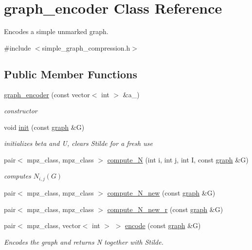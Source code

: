 \hypertarget{classgraph__encoder}{}\section{graph\+\_\+encoder Class Reference}
\label{classgraph__encoder}


Encodes a simple unmarked graph.  




{\ttfamily \#include $<$simple\+\_\+graph\+\_\+compression.\+h$>$}

\subsection*{Public Member Functions}
\begin{DoxyCompactItemize}
\item 
\hyperlink{classgraph__encoder_a571aefbf0b6ad203346fc4e0ef1a33dc}{graph\+\_\+encoder} (const vector$<$ int $>$ \&a\+\_\+)
\begin{DoxyCompactList}\small\item\em constructor \end{DoxyCompactList}\item 
void \hyperlink{classgraph__encoder_a6cfb6fca4bc50d4e5d267060a91f43c3}{init} (const \hyperlink{classgraph}{graph} \&G)
\begin{DoxyCompactList}\small\item\em initializes beta and U, clears Stilde for a fresh use \end{DoxyCompactList}\item 
pair$<$ mpz\+\_\+class, mpz\+\_\+class $>$ \hyperlink{classgraph__encoder_ae7273c47d6dab8367daa5ee6a9cdbc72}{compute\+\_\+N} (int i, int j, int I, const \hyperlink{classgraph}{graph} \&G)
\begin{DoxyCompactList}\small\item\em computes $N_{i,j}(G)$ \end{DoxyCompactList}\item 
pair$<$ mpz\+\_\+class, mpz\+\_\+class $>$ \hyperlink{classgraph__encoder_aeab221523400ec73da6146fdbbd11274}{compute\+\_\+\+N\+\_\+new} (const \hyperlink{classgraph}{graph} \&G)
\item 
pair$<$ mpz\+\_\+class, mpz\+\_\+class $>$ \hyperlink{classgraph__encoder_a0f53e165b1206e4ac0f36cf311e97baf}{compute\+\_\+\+N\+\_\+new\+\_\+r} (const \hyperlink{classgraph}{graph} \&G)
\item 
pair$<$ mpz\+\_\+class, vector$<$ int $>$ $>$ \hyperlink{classgraph__encoder_a23350e4c0986763b24d14c5ef1beb37e}{encode} (const \hyperlink{classgraph}{graph} \&G)
\begin{DoxyCompactList}\small\item\em Encodes the graph and returns N together with Stilde. \end{DoxyCompactList}\end{DoxyCompactItemize}
